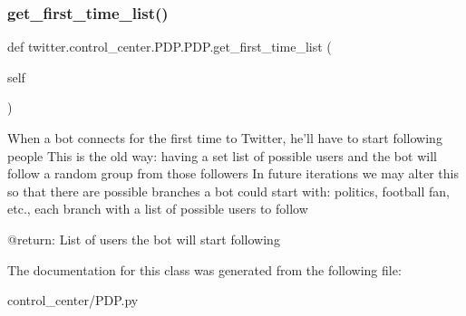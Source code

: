 \subsubsection{\texorpdfstring{get\+\_\+first\+\_\+time\+\_\+list()}{get\_first\_time\_list()}}
{\footnotesize\ttfamily def twitter.\+control\+\_\+center.\+P\+D\+P.\+P\+D\+P.\+get\+\_\+first\+\_\+time\+\_\+list (\begin{DoxyParamCaption}\item[{}]{self }\end{DoxyParamCaption})}

\begin{DoxyVerb}When a bot connects for the first time to Twitter, he'll have to start following people This is the old way:
having a set list of possible users and the bot will follow a random group from those followers In future
iterations we may alter this so that there are possible branches a bot could start with: politics,
football fan, etc., each branch with a list of possible users to follow

@return: List of users the bot will start following
\end{DoxyVerb}
 

The documentation for this class was generated from the following file\+:\begin{DoxyCompactItemize}
\item 
control\+\_\+center/P\+D\+P.\+py\end{DoxyCompactItemize}
